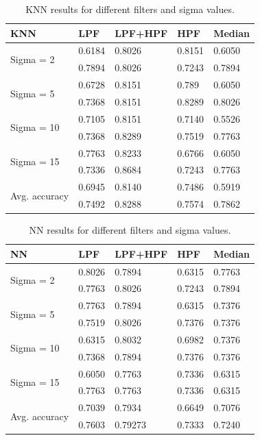 \documentclass[conference]{IEEEtran}
\begin{document}
\begin{table}[h!]
\centering
\caption{KNN results for different filters and sigma values.}
\label{table:2}
\begin{tabular}{ |p{1.4cm}||p{1.1cm}|p{1.3cm}|p{1.1cm}|p{1cm}|  }
\hline
 KNN & LPF &LPF+HPF &HPF & Median\\
 \hline
 \multirow{2}{*}{Sigma = 2} & 0.6184 & 0.8026 & 0.8151  & 0.6050 \\ 
& 0.7894 &  0.8026 & 0.7243 & 0.7894 \\
\hline
\multirow{2}{*}{Sigma = 5} & 0.6728 & 0.8151 & 0.789  & 0.6050  \\ 
 &0.7368 &  0.8151 & 0.8289 &  0.8026 \\ 
\hline
\multirow{2}{*}{Sigma = 10} & 0.7105 & 0.8151 & 0.7140  & 0.5526  \\
& 0.7368 &  0.8289 & 0.7519 &  0.7763 \\
\hline
\multirow{2}{*}{Sigma = 15} & 0.7763  & 0.8233  & 0.6766 & 0.6050 \\
& 0.7336 &  0.8684 & 0.7243 &  0.7763 \\
 \hline
 \multirow{2}{*}{Avg. accuracy} &	0.6945 & 0.8140 & 0.7486 & 0.5919   \\
&0.7492 & 0.8288 & 0.7574 & 0.7862 \\ 
\hline
\end{tabular}
\end{table}

\begin{table}[h!]
\centering
\caption{NN results for different filters and sigma values.}
\label{table:3}
\begin{tabular}{ |p{1.4cm}||p{1.1cm}|p{1.3cm}|p{1.1cm}|p{1cm}|  }
\hline
NN & LPF &LPF+HPF &HPF & Median\\
 \hline
 \multirow{2}{*}{Sigma = 2} & 0.8026  & 0.7894  & 0.6315& 0.7763  \\
 & 0.7763 &  0.8026 & 0.7243 &  0.7894 \\
\hline
\multirow{2}{*}{Sigma = 5} & 0.7763 & 0.7894 & 0.6315& 0.7376  \\
 &  0.7519 & 0.8026 &  0.7376 & 0.7376 \\
\hline
\multirow{2}{*}{Sigma = 10}  & 0.6315& 0.8032  & 0.6982 & 0.7376\\
 & 0.7368 & 0.7894 & 0.7376 & 0.7376 \\
\hline
\multirow{2}{*}{Sigma = 15} & 0.6050 & 0.7763 & 0.7336 & 0.6315 \\
&  0.7763 &  0.7763 & 0.7336 &  0.6315 \\
 \hline
  \multirow{2}{*}{Avg. accuracy} &0.7039 & 0.7934  & 0.6649 & 0.7076  \\
&0.7603 & 0.79273 & 0.7333 & 0.7240   \\
\hline
\end{tabular}
\end{table}
\end{document}

